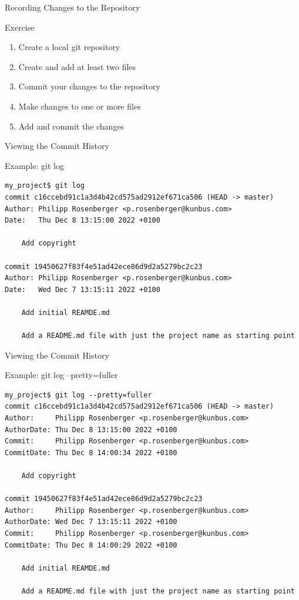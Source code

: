 \documentclass[aspectratio=169]{beamer}
\renewcommand{\footnotesize}{\tiny}
\newcommand{\sectiontitle}{}
\begin{document}
\begin{frame}[fragile]{Recording Changes to the Repository}{\sectiontitle}
\begin{block}{Exercise}
\begin{enumerate}
    \item Create a local git repository
    \item Create and add at least two files
    \item Commit your changes to the repository
    \item Make changes to one or more files
    \item Add and commit the changes
\end{enumerate}
\end{block}
\end{frame}

\begin{frame}[fragile]{Viewing the Commit History}{\sectiontitle}
\begin{block}{Example: \ttfamily git log}
\begin{verbatim}
my_project$ git log
commit c16ccebd91c1a3d4b42cd575ad2912ef671ca506 (HEAD -> master)
Author: Philipp Rosenberger <p.rosenberger@kunbus.com>
Date:   Thu Dec 8 13:15:00 2022 +0100

    Add copyright

commit 19450627f83f4e51ad42ece86d9d2a5279bc2c23
Author: Philipp Rosenberger <p.rosenberger@kunbus.com>
Date:   Wed Dec 7 13:15:11 2022 +0100

    Add initial REAMDE.md
    
    Add a README.md file with just the project name as starting point

\end{verbatim}
\end{block}
\end{frame}

\begin{frame}[fragile]{Viewing the Commit History}{\sectiontitle}
\begin{block}{Example: \ttfamily git log --pretty=fuller}
\begin{verbatim}
my_project$ git log --pretty=fuller 
commit c16ccebd91c1a3d4b42cd575ad2912ef671ca506 (HEAD -> master)
Author:     Philipp Rosenberger <p.rosenberger@kunbus.com>
AuthorDate: Thu Dec 8 13:15:00 2022 +0100
Commit:     Philipp Rosenberger <p.rosenberger@kunbus.com>
CommitDate: Thu Dec 8 14:00:34 2022 +0100

    Add copyright

commit 19450627f83f4e51ad42ece86d9d2a5279bc2c23
Author:     Philipp Rosenberger <p.rosenberger@kunbus.com>
AuthorDate: Wed Dec 7 13:15:11 2022 +0100
Commit:     Philipp Rosenberger <p.rosenberger@kunbus.com>
CommitDate: Thu Dec 8 14:00:29 2022 +0100

    Add initial REAMDE.md
    
    Add a README.md file with just the project name as starting point
\end{verbatim}
\end{block}
\end{frame}
\end{document}
